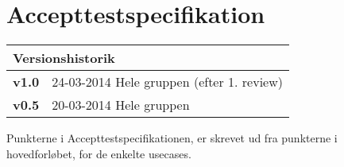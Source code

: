 \chapter{Accepttestspecifikation}

\begin{table}[!htbp] \centering
\begin{tabular}{|p{2cm}|p{8cm}|}
	\hline
		\multicolumn{2}{|l|}{Versionshistorik} \\ \hline
		\textbf{v1.0} &24-03-2014 Hele gruppen (efter 1. review) \\ \hline
		\textbf{v0.5} &20-03-2014 Hele gruppen \\ \hline
	\end{tabular}
\end{table}

Punkterne i Accepttestspecifikationen, er skrevet ud fra punkterne i hovedforløbet, for de enkelte usecases.
























